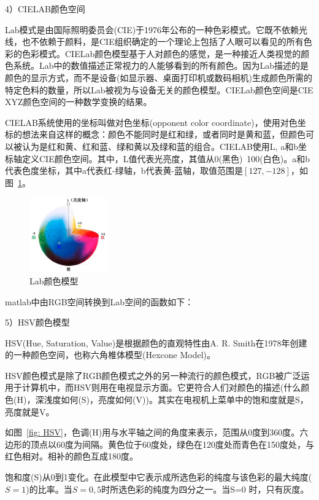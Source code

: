 \documentclass[12pt]{article}
\begin{document}
4）CIELAB颜色空间

Lab模式是由国际照明委员会(CIE)于1976年公布的一种色彩模式。它既不依赖光线，也不依赖于颜料，是CIE组织确定的一个理论上包括了人眼可以看见的所有色彩的色彩模式。CIELab颜色模型基于人对颜色的感觉，是一种接近人类视觉的颜色系统。Lab中的数值描述正常视力的人能够看到的所有颜色。因为Lab描述的是颜色的显示方式，而不是设备(如显示器、桌面打印机或数码相机)生成颜色所需的特定色料的数量，所以Lab被视为与设备无关的颜色模型。CIELab颜色空间是CIE XYZ颜色空间的一种数学变换的结果。

CIELAB系统使用的坐标叫做对色坐标(opponent color coordinate)，使用对色坐标的想法来自这样的概念：颜色不能同时是红和绿，或者同时是黄和蓝，但颜色可以被认为是红和黄、红和蓝、绿和黄以及绿和蓝的组合。CIELAB使用L, a和b坐标轴定义CIE颜色空间。其中，L值代表光亮度，其值从0(黑色)~100(白色)。a和b代表色度坐标，其中a代表红-绿轴，b代表黄-蓝轴，取值范围是$[127, -128]$，如图~\ref{fig: Lab}。
\begin{figure}[!ht]
\centering
\includegraphics[width=0.3\textwidth]{Lab.png}
\caption{Lab颜色模型}
\label{fig: Lab}
\end{figure} 

matlab中由RGB空间转换到Lab空间的函数如下：

5）HSV颜色模型

HSV(Hue, Saturation, Value)是根据颜色的直观特性由A. R. Smith在1978年创建的一种颜色空间，也称六角椎体模型(Hexcone Model)。

HSV颜色模式是除了RGB颜色模式之外的另一种流行的颜色模式，RGB被广泛运用于计算机中，而HSV则用在电视显示方面。它更符合人们对颜色的描述(什么颜色(H)，深浅度如何(S)，亮度如何(V))。其实在电视机上菜单中的饱和度就是S，亮度就是V。

如图~\ref{fig: HSV}，色调(H)用与水平轴之间的角度来表示，范围从0度到360度。六边形的顶点以60度为间隔。黄色位于60度处，绿色在120度处而青色在150度处，与红色相对。相补的颜色互成180度。

饱和度(S)从0到1变化。在此模型中它表示成所选色彩的纯度与该色彩的最大纯度($S=1$)的比率。当$S=0,5$时所选色彩的纯度为四分之一。当S=0 时，只有灰度。
\end{document}
